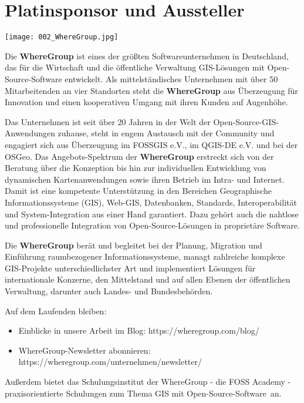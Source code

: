 \section*{Platinsponsor und Aussteller}
\begin{center}
  \centerline{\texttt{[image: 002\_WhereGroup.jpg]}}
\end{center}

\noindent
Die {\bfseries WhereGroup} ist eines der größten Softwareunternehmen in Deutschland, das für die Wirtschaft und die öffentliche Verwaltung GIS-Lösungen mit Open-Source-Software entwickelt. Als mittelständisches Unternehmen mit über 50 Mitarbeitenden an vier Standorten steht die {\bfseries WhereGroup} aus Überzeugung für Innovation und einen kooperativen Umgang mit ihren Kunden auf Augenhöhe.

\noindent
Das Unternehmen ist seit über 20 Jahren in der Welt der Open-Source-GIS-Anwendun\-gen zuhause, steht in engem Austausch mit der Community und engagiert sich aus Überzeugung im FOSSGIS e.V., im QGIS-DE e.V. und bei der OSGeo.
\newpage
\noindent
Das Angebots-Spektrum der {\bfseries WhereGroup} erstreckt sich von der Beratung über die Konzeption bis hin zur individuellen Entwicklung von dynamischen Kartenanwendungen sowie ihren Betrieb im Intra- und Internet. Damit ist eine kompetente Unterstützung in den Bereichen Geographische Informationssysteme (GIS), Web-GIS, Datenbanken, Standards, Interoperabilität und System-Inte\-gration aus einer Hand garantiert. Dazu gehört auch die nahtlose und professionelle Integration von Open-Source-Lösungen in proprietäre Software.

\noindent
Die {\bfseries WhereGroup} berät und begleitet bei der Planung, Migration und Einführung raumbezogener Informationssysteme, managt zahlreiche komplexe GIS-Projekte unterschiedlichster Art und implementiert Lösungen für internationale Konzerne, den Mittelstand und auf allen Ebenen der öffentlichen Verwaltung, darunter auch Landes- und Bundesbehörden.

\noindent
Auf dem Laufenden bleiben:

\begin{itemize}
\item Einblicke in unsere Arbeit im Blog: https://wheregroup.com/blog/
\item  WhereGroup-Newsletter abonnieren: https://wheregroup.com/unternehmen/newsletter/
 \end{itemize}

\noindent
Außerdem bietet das Schulungsinstitut der WhereGroup - die FOSS Academy -
praxisorientierte Schulungen zum Thema \glqq GIS mit Open-Source-Software\grqq\  an.
